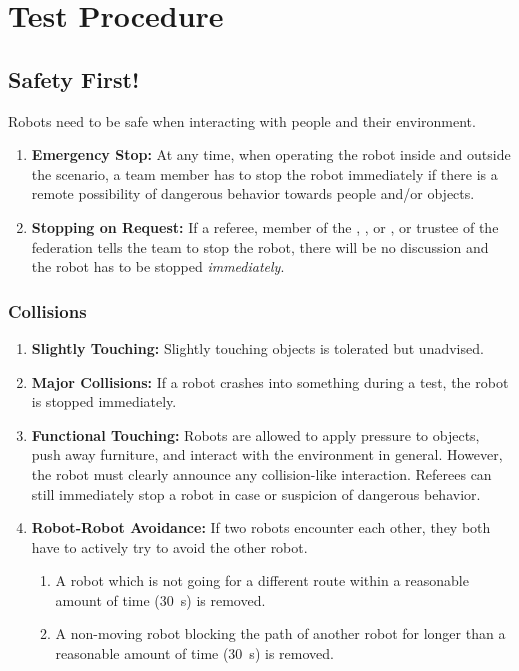 \section{Test Procedure}
\label{sec:rules:testprocedure}

\subsection{Safety First!}
\label{sec:rules:safetyfirst}
Robots need to be safe when interacting with people and their environment.
\begin{enumerate}
	\item \textbf{Emergency Stop:} At any time, when operating the robot inside and outside the scenario, a team member has to stop the robot immediately if there is a remote possibility of dangerous behavior towards people and/or objects.
	\item \textbf{Stopping on Request:} If a referee, member of the , , or , or trustee of the federation tells the team to stop the robot, there will be no discussion and the robot has to be stopped \emph{immediately}.
\end{enumerate}

\subsubsection{Collisions}
\label{sec:rules:collisions}
\begin{enumerate}
	\item \textbf{Slightly Touching:} Slightly touching objects is tolerated but unadvised.
	
	\item \textbf{Major Collisions:} If a robot crashes into something during a test, the robot is stopped immediately.
	
	\item \textbf{Functional Touching:} Robots are allowed to apply pressure to objects, push away furniture, and interact with the environment in general. However, the robot must clearly announce any collision-like interaction. Referees can still immediately stop a robot in case or suspicion of dangerous behavior.
	
	\item \textbf{Robot-Robot Avoidance:} If two robots encounter each other, they both have to actively try to avoid the other robot.
	\begin{enumerate}
		\item A robot which is not going for a different route within a reasonable amount of time (\SI{30}{\second}) is removed.
		\item A non-moving robot blocking the path of another robot for longer than a reasonable amount of time (\SI{30}{\second}) is removed.
	\end{enumerate}
\end{enumerate}


